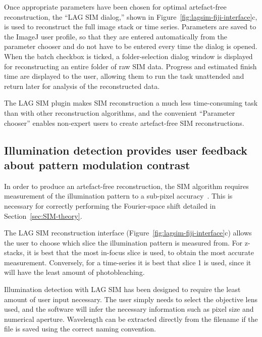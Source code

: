 Once appropriate parameters have been chosen for optimal artefact-free reconstruction, the ``LAG SIM dialog,'' shown in Figure~\ref{fig:lagsim-fiji-interface}c, is used to reconstruct the full image stack or time series.
Parameters are saved to the ImageJ user profile, so that they are entered automatically from the parameter chooser and do not have to be entered every time the dialog is opened.
When the batch checkbox is ticked, a folder-selection dialog window is displayed for reconstructing an entire folder of raw SIM data.
Progress and estimated finish time are displayed to the user, allowing them to run the task unattended and return later for analysis of the reconstructed data.

The LAG SIM plugin makes SIM reconstruction a much less time-consuming task than with other reconstruction algorithms, and the convenient ``Parameter chooser'' enables non-expert users to create artefact-free SIM reconstructions.


\subsection{\sloppy Illumination detection provides user feedback about pattern modulation contrast}\label{sec:LAGSIM-illumination-detection}
In order to produce an artefact-free reconstruction, the SIM algorithm requires measurement of the illumination pattern to a sub-pixel accuracy~\cite{muller2016open}.
This is necessary for correctly performing the Fourier-space shift detailed in Section~\ref{sec:SIM-theory}.

The LAG SIM reconstruction interface (Figure~\ref{fig:lagsim-fiji-interface}c) allows the user to choose which slice the illumination pattern is measured from.
For z-stacks, it is best that the most in-focus slice is used, to obtain the most accurate measurement.
Conversely, for a time-series it is best that slice 1 is used, since it will have the least amount of photobleaching.

Illumination detection with LAG SIM has been designed to require the least amount of user input necessary.
The user simply needs to select the objective lens used, and the software will infer the necessary information such as pixel size and numerical aperture.
Wavelength can be extracted directly from the filename if the file is saved using the correct naming convention.

